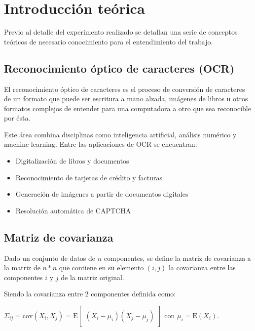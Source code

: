 \section{Introducci\'on te\'orica}

Previo al detalle del experimento realizado se detallan una serie de conceptos te\'oricos de necesario
conocimiento para el entendimiento del trabajo.

\subsection{Reconocimiento \'optico de caracteres (OCR)}

El reconocimiento \'optico de caracteres es el proceso de conversi\'on de caracteres de un formato que puede
ser escritura a mano alzada, im\'agenes de libros u otros formatos complejos de entender para una computadora
a otro que sea reconocible por \'esta.

Este \'area combina disciplinas como inteligencia artificial, an\'alisis num\'erico y machine learning. Entre
las aplicaciones de OCR se encuentran:

\begin{itemize}
  \item Digitalizaci\'on de libros y documentos
  \item Reconocimiento de tarjetas de cr\'edito y facturas
  \item Generaci\'on de im\'agenes a partir de documentos digitales
  \item Resoluci\'on autom\'atica de CAPTCHA
\end{itemize}

\subsection{Matriz de covarianza}

Dado un conjunto de datos de $n$ componentes, se define la matriz de covarianza a la matriz de $n*n$ que
contiene en su elemento $(i, j)$ la covarianza entre las componentes $i$ y $j$ de la matriz original.

Siendo la covarianza entre 2 componentes definida como:
\\

\centerline{$\Sigma_{ij} = \mathrm{cov}(X_i, X_j) = \mathrm{E}\begin{bmatrix}(X_i - \mu_i)(X_j - \mu_j) \end{bmatrix}$ con $\mu_i = \mathrm{E}(X_i)$.}

